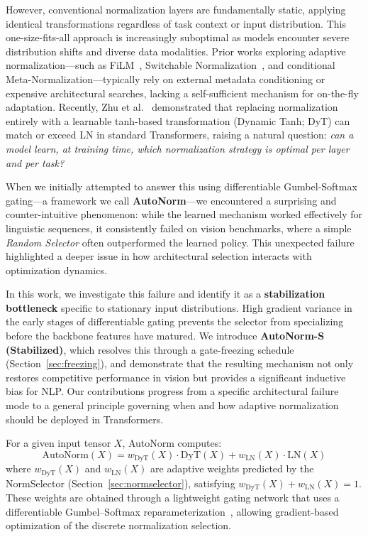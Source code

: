 \documentclass[final,3p,times,twocolumn]{elsarticle}
\begin{document}
However, conventional normalization layers are fundamentally static,
applying identical transformations regardless of task context or input
distribution. This one-size-fits-all approach is increasingly
suboptimal as models encounter severe distribution shifts and diverse
data modalities. Prior works exploring adaptive normalization---such
as FiLM~\cite{perez2018film}, Switchable
Normalization~\cite{luo2019switchable}, and conditional
Meta-Normalization---typically rely on external metadata conditioning
or expensive architectural searches, lacking a self-sufficient
mechanism for on-the-fly adaptation. Recently, Zhu et
al.~\cite{zhu2025transformers} demonstrated that replacing
normalization entirely with a learnable tanh-based transformation
(Dynamic Tanh; DyT) can match or exceed LN in standard Transformers,
raising a natural question: \textit{can a model learn, at training
time, which normalization strategy is optimal per layer and per task?}

When we initially attempted to answer this using differentiable
Gumbel-Softmax gating---a framework we call \textbf{AutoNorm}---we
encountered a surprising and counter-intuitive phenomenon: while the
learned mechanism worked effectively for linguistic sequences, it
consistently failed on vision benchmarks, where a simple \textit{Random
Selector} often outperformed the learned policy. This unexpected
failure highlighted a deeper issue in how architectural selection
interacts with optimization dynamics.

In this work, we investigate this failure and identify it as a
\textbf{stabilization bottleneck} specific to stationary input
distributions. High gradient variance in the early stages of
differentiable gating prevents the selector from specializing before
the backbone features have matured. We introduce \textbf{AutoNorm-S
(Stabilized)}, which resolves this through a gate-freezing schedule
(Section~\ref{sec:freezing}), and demonstrate that the resulting
mechanism not only restores competitive performance in vision but
provides a significant inductive bias for NLP. Our contributions
progress from a specific architectural failure mode to a general
principle governing when and how adaptive normalization should be
deployed in Transformers.

For a given input tensor $X$, AutoNorm computes:
\begin{equation}
  \text{AutoNorm}(X) = w_{\text{DyT}}(X) \cdot \text{DyT}(X)
                     + w_{\text{LN}}(X)  \cdot \text{LN}(X)
  \label{eq:autonorm}
\end{equation}
where $w_{\text{DyT}}(X)$ and $w_{\text{LN}}(X)$ are adaptive weights
predicted by the NormSelector (Section~\ref{sec:normselector}),
satisfying $w_{\text{DyT}}(X) + w_{\text{LN}}(X) = 1$. These weights
are obtained through a lightweight gating network that uses a
differentiable Gumbel--Softmax
reparameterization~\cite{jang2017gumbelsoftmax}, allowing
gradient-based optimization of the discrete normalization selection.
\end{document}
